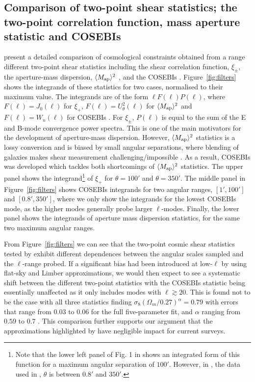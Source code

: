 \subsection{Comparison of two-point shear statistics; the two-point correlation function, mass aperture statistic and COSEBIs}
\citet{kilbinger/etal:2013} present a detailed comparison of cosmological constraints obtained from a range different two-point shear statistics including the shear correlation function, $\xi_\pm$, the aperture-mass dispersion, $\langle M_ {\rm ap} \rangle ^2$ \citep{schneider/etal:1998}, and the COSEBIs \citep{schneider/etal:2010}.  Figure~\ref{fig:filters} shows the integrands of these statistics 
for two cases, normalised to their maximum value.  The integrands are of the form $\ell F(\ell) P(\ell)$, where $F(\ell)=J_0(\ell)$ for $\xi_+$, $F(\ell)= U^2_\theta(\ell)$ for  $\langle M_ {\rm ap} \rangle^2$ \citep[see][]{schneider/etal:1998} and $F(\ell)=W_n(\ell)$ for COSEBIs \citep[see][]{schneider/etal:2010}. For $\xi_\pm$, $P(\ell)$ is equal to the sum of the E and B-mode convergence power spectra. This is one of the main motivators for the development of aperture-mass dispersion. However, $\langle M_ {\rm ap} \rangle ^2$ statistics is a lossy conversion and is biased by small angular separations,
where blending of galaxies makes shear measurement challenging/impossible \citep{kilbinger/etal:2006}. As a result, COSEBIs was developed which tackles both shortcomings of $\langle M_ {\rm ap} \rangle ^2$ statistics.
The upper panel shows the integrand\footnote{Note that the lower left panel of Fig. 1 in \citet{kitching/etal:2016} shows an integrated form of this function for a maximum angular separation of $100'$. However, in \citet{kilbinger/etal:2013}, the data used in \citet{kitching/etal:2016}, $\theta$ is between $0.8'$ and $350'$.} of $\xi_+$ for $\theta=100'$ and $\theta=350'$. The middle panel in Figure~\ref{fig:filters} shows COSEBIs integrands for two angular ranges, $[1',100']$ and $[0.8',350']$, where we only show the integrands for the lowest COSEBIs mode, as the higher modes generally probe larger $\ell$-modes.  Finally, the lower panel shows the integrands of aperture mass dispersion statistics, for the same two maximum angular ranges. 

From Figure~\ref{fig:filters} we can see that the two-point cosmic shear statistics tested by \citet{kilbinger/etal:2013} exhibit different dependences between the angular scales sampled and the $\ell$-range probed.   
If a significant bias had been introduced at low-$\ell$ by using flat-sky and Limber approximations, we would then expect to see a systematic shift between the different two-point statistics with the COSEBIs statistic being essentially unaffected as it only includes modes with $\ell \gtrsim 20$.  This is found not to be the case with all three statistics finding $\sigma_8 (\Omega_m/0.27)^\alpha = 0.79$ with errors that range from $0.03$ to $0.06$ for the full five-parameter fit, and $\alpha$ ranging from $0.59$ to 0.7 \citep[see Table 5 of][]{kilbinger/etal:2013}.  This comparison further supports our argument that the approximations highlighted by \citet{kitching/etal:2016} have negligible impact for current surveys.

